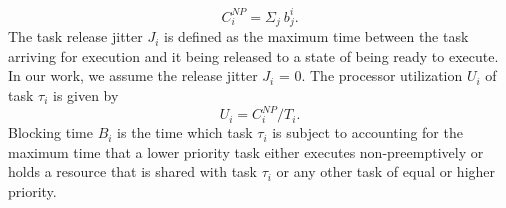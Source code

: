 \begin{equation}\label{eqn:c-np2}
    C_{i}^{NP} = \Sigma_{j}\ b_{j}^{i}.
\end{equation}
\noindent
The task release jitter \begin{math}J_{i}\end{math} is defined as the maximum time between the task arriving for execution and it being released to a state of being ready to execute.  In our work, we assume the release jitter \begin{math}J_{i}\end{math} = 0.  The processor utilization \begin{math}U_{i}\end{math} of task \begin{math}\tau_{i}\end{math} is given by
\begin{equation}\label{eqn:u-task}
    U_{i} = C_{i}^{NP}/T_{i}.
\end{equation}
\noindent
Blocking time \begin{math}B_{i}\end{math} is the time which task \begin{math}\tau_{i}\end{math} is subject to accounting for the maximum time that a lower priority task either executes non-preemptively or holds a resource that is shared with task \begin{math}\tau_{i}\end{math} or any other task of equal or higher priority.

